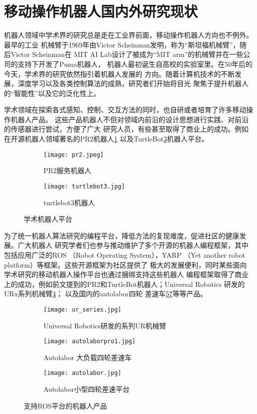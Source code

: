 \section{移动操作机器人国内外研究现状}
\label{cha:research}

机器人领域中学术界的研究总是走在工业界前面，移动操作机器人方向也不例外。最早的工业
机械臂于1969年由Victor Scheinman发明，称为“斯坦福机械臂”，随后Victor Scheinman在
MIT AI Lab设计了被成为“MIT arm”的机械臂并在一些公司的支持下开发了Puma机器人\cite{huangxihuanReview}，
机器人最初诞生自高校的实验室里。在50年后的今天，学术界的研究依然指引着机器人发展的
方向。随着计算机技术的不断发展，深度学习以及各类控制算法的成熟，研究者们开始将目光
聚焦于提升机器人的“智能性”以及它的泛化性上。

学术领域在探索各式感知、控制、交互方法的同时，也自研或者培育了许多移动操作机器人产品。
这些产品机器人不但对领域内前沿的设计思想进行实践、对前沿的传感器进行尝试，方便了广大
研究人员，有些甚至取得了商业上的成功。例如在开源机器人领域著名的PR2机器人\ref{fig:pr2}
以及TurtleBot\ref{fig:turtlebot}机器人平台。

\begin{figure}
\centering
\begin{subfigure}{.6\textwidth}
  \centering
  \texttt{[image: pr2.jpeg]}
  \caption{PR2服务机器人}
  \label{fig:pr2}
\end{subfigure}%
\begin{subfigure}{.4\textwidth}
  \centering
  \texttt{[image: turtlebot3.jpg]}
  \caption{turtlebot3机器人}
  \label{fig:turtlebot}
\end{subfigure}
\caption{学术机器人平台}
\end{figure}

为了统一机器人算法研究的编程平台，降低方法的复现难度，促进社区的健康发展。广大机器人
研究学者们也参与推动维护了多个开源的机器人编程框架，其中包括应用广泛的ROS
（Robot Operating System）\cite{quigley2009ros}，YARP
（Yet another robot platform）\cite{metta2006yarp}等框架。这些开源框架为社区提供了
极大的发展便利，同时某些面向学术研究的移动机器人操作平台也通过捆绑支持这些机器人
编程框架取得了商业上的成功，例如前文提到的PR2和TurtleBot机器人；Universal Robotics
研发的URx系列机械臂\ref{fig:urx}； 以及国内的autolabor四轮
差速车\ref{fig:autolaborpro1}\ref{fig:autolabor}等等产品。


\begin{figure}
\centering
\begin{subfigure}{.6\textwidth}
  \centering
  \texttt{[image: ur\_series.jpg]}
  \caption{Universal Robotics研发的系列UR机械臂}
  \label{fig:urx}
\end{subfigure}%
\begin{subfigure}{.4\textwidth}
  \centering
  \texttt{[image: autolaborpro1.jpg]}
  \caption{Autolabor 大负载四轮差速车}
  \label{fig:autolaborpro1}
\end{subfigure}
\begin{subfigure}{.5\textwidth}
  \centering
  \texttt{[image: autolabor.jpg]}
  \caption{Autolabor小型四轮差速平台}
  \label{fig:autolabor}
\end{subfigure}
\caption{支持ROS平台的机器人产品}
\end{figure}


